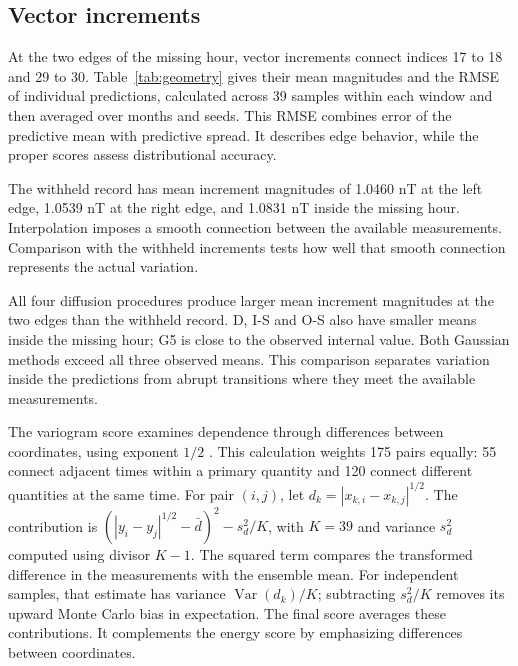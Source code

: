 \documentclass{article}
\begin{document}
\subsection{Vector increments}

At the two edges of the missing hour, vector increments connect indices 17 to 18 and 29 to 30. Table~\ref{tab:geometry} gives their mean magnitudes and the RMSE of individual predictions, calculated across 39 samples within each window and then averaged over months and seeds. This RMSE combines error of the predictive mean with predictive spread. It describes edge behavior, while the proper scores assess distributional accuracy.

The withheld record has mean increment magnitudes of 1.0460 nT at the left edge, 1.0539 nT at the right edge, and 1.0831 nT inside the missing hour. Interpolation imposes a smooth connection between the available measurements. Comparison with the withheld increments tests how well that smooth connection represents the actual variation.

All four diffusion procedures produce larger mean increment magnitudes at the two edges than the withheld record. D, I-S and O-S also have smaller means inside the missing hour; G5 is close to the observed internal value. Both Gaussian methods exceed all three observed means. This comparison separates variation inside the predictions from abrupt transitions where they meet the available measurements.

The variogram score examines dependence through differences between coordinates, using exponent $1/2$ \citep{scheuerer2015variogram}. This calculation weights 175 pairs equally: 55 connect adjacent times within a primary quantity and 120 connect different quantities at the same time. For pair $(i,j)$, let $d_k=|x_{k,i}-x_{k,j}|^{1/2}$. The contribution is $(|y_i-y_j|^{1/2}-\bar d)^2-s_d^2/K$, with $K=39$ and variance $s_d^2$ computed using divisor $K-1$. The squared term compares the transformed difference in the measurements with the ensemble mean. For independent samples, that estimate has variance $\operatorname{Var}(d_k)/K$; subtracting $s_d^2/K$ removes its upward Monte Carlo bias in expectation. The final score averages these contributions. It complements the energy score by emphasizing differences between coordinates.
\end{document}
